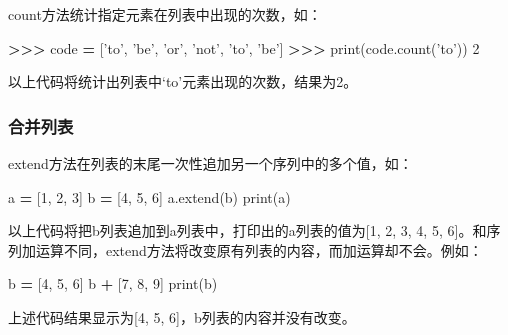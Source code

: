 \documentclass[]{ctexbook}
\newenvironment{Shaded}{\begin{snugshade}}{\end{snugshade}}
\newcommand{\BuiltInTok}[1]{#1}
\newcommand{\DecValTok}[1]{\textcolor[rgb]{0.00,0.00,0.81}{#1}}
\newcommand{\NormalTok}[1]{#1}
\newcommand{\OperatorTok}[1]{\textcolor[rgb]{0.81,0.36,0.00}{\textbf{#1}}}
\newcommand{\StringTok}[1]{\textcolor[rgb]{0.31,0.60,0.02}{#1}}
\begin{document}
count方法统计指定元素在列表中出现的次数，如：

\begin{Shaded}
\begin{Highlighting}[]
\OperatorTok{>>>}\NormalTok{ code }\OperatorTok{=}\NormalTok{ [}\StringTok{'to'}\NormalTok{, }\StringTok{'be'}\NormalTok{, }\StringTok{'or'}\NormalTok{, }\StringTok{'not'}\NormalTok{, }\StringTok{'to'}\NormalTok{, }\StringTok{'be'}\NormalTok{]}
\OperatorTok{>>>} \BuiltInTok{print}\NormalTok{(code.count(}\StringTok{'to'}\NormalTok{))}
\DecValTok{2}
\end{Highlighting}
\end{Shaded}

以上代码将统计出列表中`to'元素出现的次数，结果为2。

\hypertarget{ux5408ux5e76ux5217ux8868}{%
\subsubsection{合并列表}\label{ux5408ux5e76ux5217ux8868}}

extend方法在列表的末尾一次性追加另一个序列中的多个值，如：

\begin{Shaded}
\begin{Highlighting}[]
\NormalTok{a }\OperatorTok{=}\NormalTok{ [}\DecValTok{1}\NormalTok{, }\DecValTok{2}\NormalTok{, }\DecValTok{3}\NormalTok{]}
\NormalTok{b }\OperatorTok{=}\NormalTok{ [}\DecValTok{4}\NormalTok{, }\DecValTok{5}\NormalTok{, }\DecValTok{6}\NormalTok{]}
\NormalTok{a.extend(b)}
\BuiltInTok{print}\NormalTok{(a)}
\end{Highlighting}
\end{Shaded}

以上代码将把b列表追加到a列表中，打印出的a列表的值为{[}1, 2, 3, 4, 5, 6{]}。和序列加运算不同，extend方法将改变原有列表的内容，而加运算却不会。例如：

\begin{Shaded}
\begin{Highlighting}[]
\NormalTok{b }\OperatorTok{=}\NormalTok{ [}\DecValTok{4}\NormalTok{, }\DecValTok{5}\NormalTok{, }\DecValTok{6}\NormalTok{]}
\NormalTok{b }\OperatorTok{+}\NormalTok{ [}\DecValTok{7}\NormalTok{, }\DecValTok{8}\NormalTok{, }\DecValTok{9}\NormalTok{]}
\BuiltInTok{print}\NormalTok{(b)}
\end{Highlighting}
\end{Shaded}

上述代码结果显示为{[}4, 5, 6{]}，b列表的内容并没有改变。
\end{document}
